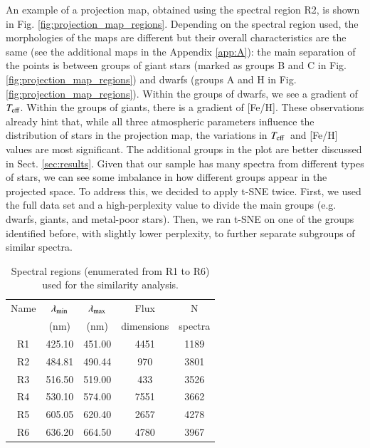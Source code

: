 \documentclass{aa}
\def\teff{$\textit{T}_{\rm{eff}}$}
\begin{document}
An example of a projection map, obtained using the spectral region R2, is shown in Fig. \ref{fig:projection_map_regions}. Depending on the spectral region used, the morphologies of the maps are different but their overall characteristics are the same (see the additional maps in the Appendix \ref{app:A}): the main separation of the points is between groups of giant stars (marked as groups B and C in Fig. \ref{fig:projection_map_regions}) and dwarfs (groups A and H in Fig. \ref{fig:projection_map_regions}). Within the groups of dwarfs, we see a gradient of \teff. Within the groups of giants, there is a gradient of [Fe/H]. These observations already hint that, while all three atmospheric parameters influence the distribution of stars in the projection map, the variations in \teff~and [Fe/H] values are most significant. The additional groups in the plot are better discussed in Sect. \ref{sec:results}. Given that our sample has many spectra from different types of stars, we can see some imbalance in how different groups appear in the projected space. To address this, we decided to apply t-SNE twice. First, we used the full data set and a high-perplexity value to divide the main groups (e.g. dwarfs, giants, and metal-poor stars). Then, we ran t-SNE on one of the groups identified before, with slightly lower perplexity, to further separate subgroups of similar spectra.

\begin{table}
\caption{Spectral regions (enumerated from R1 to  R6) used for the similarity analysis.}             
\label{tab:regions}      
\centering                          
\begin{tabular}{c c c c c}         
\hline\hline                 
Name & $\lambda_{\rm min}$  & $\lambda_{\rm max}$  & Flux       & N\\ 
     &    (nm)                      &      (nm)                    & dimensions & spectra\\
\hline                        
R1      & 425.10          & 451.00          & 4451           & 1189        \\
R2      & 484.81          & 490.44          & 970            & 3801        \\
R3      & 516.50          & 519.00          & 433            & 3526        \\
R4      & 530.10          & 574.00          & 7551           & 3662        \\
R5      & 605.05          & 620.40          & 2657           & 4278        \\
R6      & 636.20          & 664.50          & 4780           & 3967        \\
\hline                                   
\end{tabular}
\end{table}
\end{document}
